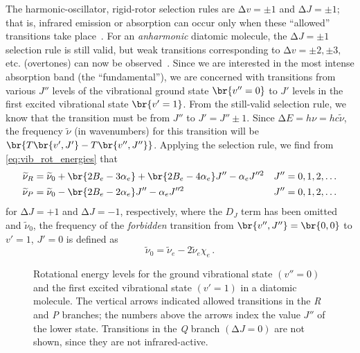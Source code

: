 The harmonic-oscillator, rigid-rotor selection rules are \( \increment v = \pm 1 \) and \( \increment J = \pm 1\); that is, infrared emission or absorption can occur only when these ``allowed'' transitions take place~\autocite{herzberg89}.
For an \emph{anharmonic} diatomic molecule, the \( \increment J = \pm 1 \) selection rule is still valid, but weak transitions corresponding to \( \increment v = \pm2, \pm3, \) etc. (overtones) can now be observed~\autocite{herzberg89}. 
Since we are interested in the most intense absorption band (the ``fundamental''), we are concerned with transitions from various \( J'' \) levels of the vibrational ground state \( \br{v'' = 0} \) to \( J' \) levels in the first excited vibrational state \( \br{v' = 1} \). 
From the still-valid selection rule, we know that the transition must be from \( J'' \) to \( J' = J'' \pm 1 \). 
Since \( \increment E = h \nu = h c \widetilde{\nu} \), the frequency \( \widetilde{\nu} \) (in wavenumbers) for this transition will be \( \br{T\br{v', J'} - T\br{v'', J''}} \). Applying the selection rule, we find from \cref{eq:vib_rot_energies} that
\begin{align}
	\widetilde{\nu}_R &= \widetilde{\nu}_0 + \br{2 B_e - 3 \alpha_e} + \br{2 B_e - 4 \alpha_e} J'' - \alpha_e J''^2 	&	J'' &= 0, 1, 2, \ldots 
	\label{eq:r_branch} 
	\\
	\widetilde{\nu}_P &= \widetilde{\nu}_0 -													 \br{2 B_e - 2 \alpha_e} J'' - \alpha_e J''^2 	&	J'' &= 0, 1, 2, \ldots 
	\label{eq:p_branch}
\end{align}
for \( \increment J = +1 \) and \( \increment J = -1 \), respectively, where the \( D_J \) term has been omitted and \( \widetilde{\nu}_0 \), the frequency of the \emph{forbidden} transition from \( {\br{v'',J''} = \br{0, 0}} \) to \( {v' = 1} \), \( {J' = 0} \) is defined as
\begin{equation}
	\widetilde{\nu}_0 = \widetilde{\nu}_e - 2 \widetilde{\nu}_e \chi_e \, .
	\label{eq:forbid_transition}
\end{equation}

\begin{figure}[tb]
  \centering
    
    \caption{Rotational energy levels for the ground vibrational state \( {(v'' = 0)} \) and the first excited vibrational state \( {(v' = 1)} \) in a diatomic molecule.
      The vertical arrows indicated allowed transitions in the \emph{R} and \emph{P} branches; the numbers above the arrows index the value \( J'' \) of the lower state.
      Transitions in the \emph{Q} branch \( {(\increment J = 0)} \) are not shown, since they are not infrared-active.
      }
    \label{fig:typ_spectrum}
\end{figure}

